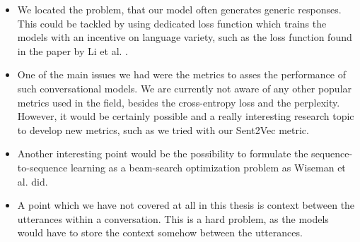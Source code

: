\begin{itemize}
  \item We located the problem, that our model often generates generic responses. This could be tackled by using dedicated loss function which trains the models with an incentive on language variety, such as the loss function found in the paper by Li et al. \cite{Li:2016}.

  \item One of the main issues we had were the metrics to asses the performance of such conversational models. We are currently not aware of any other popular metrics used in the field, besides the cross-entropy loss and the perplexity. However, it would be certainly possible and a really interesting research topic to develop new metrics, such as we tried with our Sent2Vec metric.

  \item Another interesting point would be the possibility to formulate the sequence-to-sequence learning as a beam-search optimization problem as Wiseman et al. \cite{Wiseman:2016} did.

  \item A point which we have not covered at all in this thesis is context between the utterances within a conversation. This is a hard problem, as the models would have to store the context somehow between the utterances.
\end{itemize}
